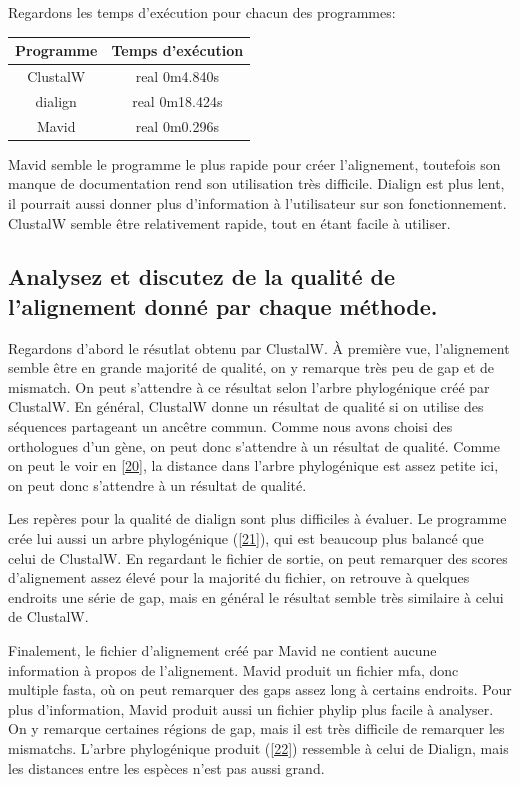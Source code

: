 \documentclass[11pt]{article} %
\begin{document}
Regardons les temps d'exécution pour chacun des programmes:
\begin{tabular}{|c|c|}
 \hline
 Programme & Temps d'exécution \\
 \hline
 ClustalW & real 0m4.840s \\
 \hline
 dialign & real 0m18.424s \\
 \hline
 Mavid & real 0m0.296s\\
 \hline
\end{tabular}

Mavid semble le programme le plus rapide pour créer l'alignement, toutefois son manque de documentation rend son utilisation
très difficile. Dialign est plus lent, il pourrait aussi donner plus d'information à l'utilisateur sur son fonctionnement.
ClustalW semble être relativement rapide, tout en étant facile à utiliser.

\subsection[Qualité des alignements]{Analysez et discutez de la qualité de l'alignement donné par chaque méthode.}

Regardons d'abord le résutlat obtenu par ClustalW. À première vue, l'alignement semble être en grande majorité de qualité,
on y remarque très peu de gap et de mismatch. On peut s'attendre à ce résultat selon l'arbre phylogénique
créé par ClustalW. En général, ClustalW donne un résultat de qualité si on utilise des séquences partageant un ancêtre commun.
Comme nous avons choisi des orthologues d'un gène, on peut donc s'attendre à un résultat de qualité. Comme on peut le voir en
\ref{20}, la distance dans l'arbre phylogénique est assez petite ici, on peut donc s'attendre à un résultat de qualité.

Les repères pour la qualité de dialign sont plus difficiles à évaluer. Le programme crée lui aussi un arbre phylogénique (\ref{21}),
qui est beaucoup plus balancé que celui de ClustalW. En regardant le fichier de sortie, on peut remarquer des scores 
d'alignement assez élevé pour la majorité du fichier, on retrouve à quelques endroits une série de gap, mais en général le résultat
semble très similaire à celui de ClustalW.

Finalement, le fichier d'alignement créé par Mavid ne contient aucune information à propos de l'alignement. Mavid produit un fichier
mfa, donc multiple fasta, où on peut remarquer des gaps assez long à certains endroits. Pour plus d'information, Mavid produit
aussi un fichier phylip plus facile à analyser. On y remarque certaines régions de gap, mais il est très difficile
de remarquer les mismatchs. L'arbre phylogénique produit (\ref{22}) ressemble à celui de Dialign, mais les distances entre les
espèces n'est pas aussi grand.
\end{document}
